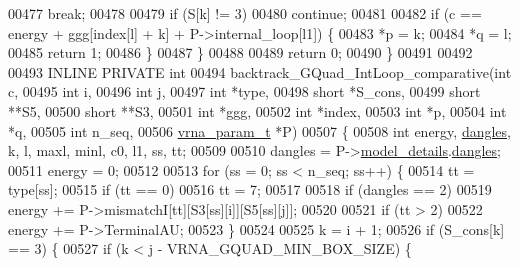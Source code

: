 \begin{DoxyCode}
00477         \textcolor{keywordflow}{break};
00478 
00479       \textcolor{keywordflow}{if} (S[k] != 3)
00480         \textcolor{keywordflow}{continue};
00481 
00482       \textcolor{keywordflow}{if} (c == energy + ggg[index[l] + k] + P->internal\_loop[l1]) \{
00483         *p  = k;
00484         *q  = l;
00485         \textcolor{keywordflow}{return} 1;
00486       \}
00487     \}
00488 
00489   \textcolor{keywordflow}{return} 0;
00490 \}
00491 
00492 
00493 INLINE PRIVATE \textcolor{keywordtype}{int}
00494 backtrack\_GQuad\_IntLoop\_comparative(\textcolor{keywordtype}{int}           c,
00495                                     \textcolor{keywordtype}{int}           i,
00496                                     \textcolor{keywordtype}{int}           j,
00497                                     \textcolor{keywordtype}{int}           *type,
00498                                     \textcolor{keywordtype}{short}         *S\_cons,
00499                                     \textcolor{keywordtype}{short}         **S5,
00500                                     \textcolor{keywordtype}{short}         **S3,
00501                                     \textcolor{keywordtype}{int}           *ggg,
00502                                     \textcolor{keywordtype}{int}           *index,
00503                                     \textcolor{keywordtype}{int}           *p,
00504                                     \textcolor{keywordtype}{int}           *q,
00505                                     \textcolor{keywordtype}{int}           n\_seq,
00506                                     \hyperlink{group__energy__parameters_structvrna__param__s}{vrna\_param\_t}  *P)
00507 \{
00508   \textcolor{keywordtype}{int} energy, \hyperlink{group__model__details_ga72b511ed1201f7e23ec437e468790d74}{dangles}, k, l, maxl, minl, c0, l1, ss, tt;
00509 
00510   dangles = P->\hyperlink{group__energy__parameters_a7b84353eb9075c595bad4ceb871bcae7}{model\_details}.\hyperlink{group__model__details_adcda4ff2ea77748ae0e8700288282efc}{dangles};
00511   energy  = 0;
00512 
00513   \textcolor{keywordflow}{for} (ss = 0; ss < n\_seq; ss++) \{
00514     tt = type[ss];
00515     \textcolor{keywordflow}{if} (tt == 0)
00516       tt = 7;
00517 
00518     \textcolor{keywordflow}{if} (dangles == 2)
00519       energy += P->mismatchI[tt][S3[ss][i]][S5[ss][j]];
00520 
00521     \textcolor{keywordflow}{if} (tt > 2)
00522       energy += P->TerminalAU;
00523   \}
00524 
00525   k = i + 1;
00526   \textcolor{keywordflow}{if} (S\_cons[k] == 3) \{
00527     \textcolor{keywordflow}{if} (k < j - VRNA\_GQUAD\_MIN\_BOX\_SIZE) \{

\end{DoxyCode}
